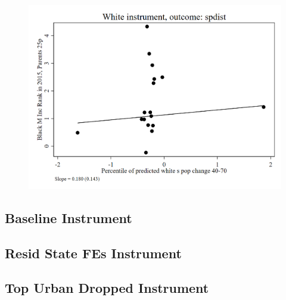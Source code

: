 \documentclass{article}
\begin{document}
\clearpage
\begin{figure}
	\centering
	\includegraphics[width=.8\textwidth]{figures/exogeneity_tests/D14_spdist.png}
\end{figure}
\clearpage


\subsection{Baseline Instrument}



\clearpage



\clearpage

\subsection{Resid State FEs Instrument}



\clearpage



\clearpage


\subsection{Top Urban Dropped Instrument}



\clearpage

\end{document}
